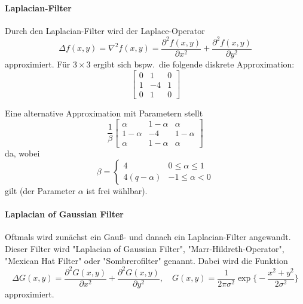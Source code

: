 \documentclass[a4paper, 11pt, accentcolor = tud3b]{tudreport}
\newcommand{\bspw}{bspw.~}
\begin{document}
					\paragraph{Laplacian-Filter}
						Durch den Laplacian-Filter wird der Laplace-Operator
						\begin{equation*}
							\Delta f(x, y) = \nabla^2 f(x, y) = \frac{\partial^2 f(x, y)}{\partial x^2} + \frac{\partial^2 f(x, y)}{\partial y^2}
						\end{equation*}
						approximiert. Für \( 3 \times 3 \) ergibt sich \bspw die folgende diskrete Approximation:
						\begin{equation*}
							\begin{bmatrix}
								0 & 1  & 0 \\
								1 & -4 & 1 \\
								0 & 1  & 0
							\end{bmatrix}
						\end{equation*}
						
						Eine alternative Approximation mit Parametern stellt
						\begin{equation*}
							\frac{1}{\beta}
							\begin{bmatrix}
								\alpha     & 1 - \alpha & \alpha     \\
								1 - \alpha & -4         & 1 - \alpha \\
								\alpha     & 1 - \alpha & \alpha
							\end{bmatrix}
						\end{equation*}
						da, wobei
						\begin{equation*}
							\beta =
								\begin{cases}
									4             & 0 \leq \alpha \leq 1 \\
									4(q - \alpha) & -1 \leq \alpha < 0
								\end{cases}
						\end{equation*}
						gilt (der Parameter \( \alpha \) ist frei wählbar).
					
					\paragraph{Laplacian of Gaussian Filter}
						Oftmals wird zunächst ein Gauß- und danach ein Laplacian-Filter angewandt. Dieser Filter wird "Laplacian of Gaussian Filter", "Marr-Hildreth-Operator", "Mexican Hat Filter" oder "Sombrerofilter" genannt. Dabei wird die Funktion
						\begin{equation*}
							\Delta G(x, y) = \frac{\partial^2 G(x, y)}{\partial x^2} + \frac{\partial^2 G(x, y)}{\partial y^2},\quad G(x, y) = \frac{1}{2\pi\sigma^2} \exp \Bigg\{ -\frac{x^2 + y^2}{2\sigma^2} \Bigg\}
						\end{equation*}
						approximiert.
				
\end{document}

